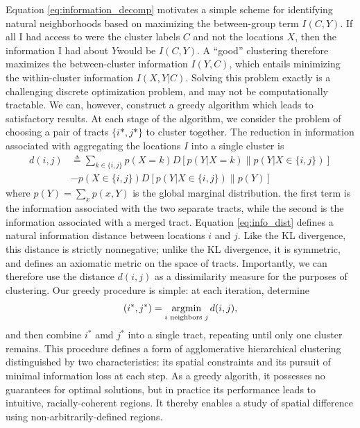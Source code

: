 	Equation \eqref{eq:information_decomp} motivates a simple scheme for identifying natural neighborhoods based on maximizing the between-group term $I(C,Y)$. If all I had access to were the cluster labels $C$ and not the locations $X$, then the information I had about $Y$would be $I(C,Y)$. A ``good'' clustering therefore maximizes the between-cluster information $I(Y,C)$, which entails minimizing the within-cluster information $I(X,Y|C)$. Solving this problem exactly is a challenging discrete optimization problem, and may not be computationally tractable. We can, however, construct a greedy algorithm which leads to satisfactory results. At each stage of the algorithm, we consider the problem of choosing a pair of tracts $\{i*,j*\}$ to cluster together. The reduction in information associated with aggregating the locations $I$ into a single cluster is 
	\begin{align}
		d(i,j) &\triangleq  \sum_{k \in \{i,j\}} p(X = k)D[p(Y|X = k)\| p(Y|X \in \{i,j\})] \\
		&- p(X\in \{i,j\})D[p(Y|X\in \{i,j\}) \| p(Y)] \label{eq:info_dist}
	\end{align}
	where $p(Y) = \sum_{x} p(x,Y)$ is the global marginal distribution. the first term is the information associated with the two separate tracts, while the second is the information associated with a merged tract. Equation \eqref{eq:info_dist} defines a natural information distance between locations $i$ and $j$. Like the KL divergence, this distance is strictly nonnegative; unlike the KL divergence, it is symmetric, and defines an axiomatic metric on the space of tracts. Importantly, we can therefore use the distance $d(i,j)$ as a dissimilarity measure for the purposes of clustering. Our greedy procedure is simple: at each iteration, determine
	\begin{equation}
		(i^*,j^*) = \argmin_{i \text{ neighbors } j} d(i,j),
	\end{equation}
	and then combine $i^*$ amd $j^*$ into a single tract, repeating until only one cluster remains. This procedure defines a form of agglomerative hierarchical clustering distinguished by two characteristics: its spatial constraints and its pursuit of minimal information loss at each step. As a greedy algorith, it possesses no guarantees for optimal solutions, but in practice its performance leads to intuitive, racially-coherent regions. It thereby enables a study of spatial difference using non-arbitrarily-defined regions. 






